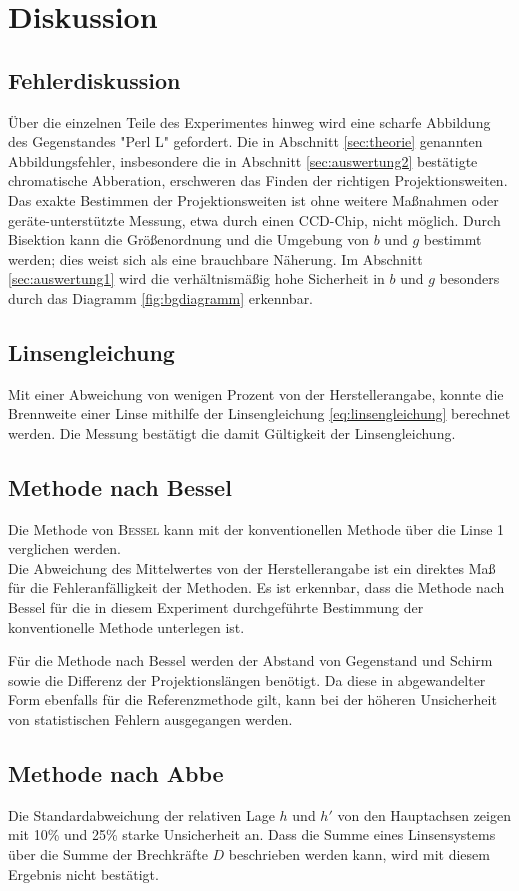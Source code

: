 \section{Diskussion}
\label{sec:Diskussion}
\subsection{Fehlerdiskussion}
Über die einzelnen Teile des Experimentes hinweg wird eine scharfe Abbildung des Gegenstandes "Perl L" gefordert.
Die in Abschnitt \ref{sec:theorie} genannten Abbildungsfehler, 
insbesondere die in Abschnitt \ref{sec:auswertung2} bestätigte chromatische Abberation, 
erschweren das Finden der richtigen Projektionsweiten. 
Das exakte Bestimmen der Projektionsweiten ist ohne weitere Maßnahmen oder geräte-unterstützte Messung, etwa durch einen CCD-Chip, nicht möglich.
Durch Bisektion kann die Größenordnung und die Umgebung von $b$ und $g$ bestimmt werden; dies weist sich als eine brauchbare Näherung.
Im Abschnitt \ref{sec:auswertung1} wird die verhältnismäßig hohe Sicherheit in $b$ und $g$ besonders durch das Diagramm \ref{fig:bgdiagramm} erkennbar.

\subsection{Linsengleichung}
Mit einer Abweichung von wenigen Prozent von der Herstellerangabe, konnte die Brennweite einer Linse mithilfe der Linsengleichung \eqref{eq:linsengleichung} berechnet werden.
Die Messung bestätigt die damit Gültigkeit der Linsengleichung.

\subsection{Methode nach Bessel}
Die Methode von \texorpdfstring{\textsc{Bessel}}{Bessel} kann mit der konventionellen Methode über die Linse 1 verglichen werden.\\
Die Abweichung des Mittelwertes von der Herstellerangabe ist ein direktes Maß für die Fehleranfälligkeit der Methoden. 
Es ist erkennbar, dass die Methode nach Bessel für die in diesem Experiment durchgeführte Bestimmung der konventionelle Methode unterlegen ist.

Für die Methode nach Bessel werden der Abstand von Gegenstand und Schirm sowie die Differenz der Projektionslängen benötigt. 
Da diese in abgewandelter Form ebenfalls für die Referenzmethode gilt, kann bei der höheren Unsicherheit von statistischen Fehlern ausgegangen werden.

\subsection{Methode nach Abbe}
Die Standardabweichung der relativen Lage $h$ und $h'$ von den Hauptachsen zeigen mit 10\% und 25\% starke Unsicherheit an.
Dass die Summe eines Linsensystems über die Summe der Brechkräfte $D$ beschrieben werden kann, wird mit diesem Ergebnis nicht bestätigt.